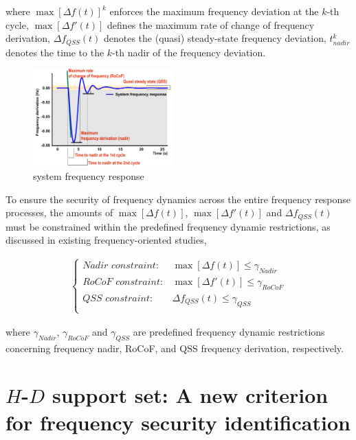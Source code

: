 \documentclass[lettersize,journal]{IEEEtran}
\begin{document}
\noindent
where $\max [\varDelta f(t)]^k$ enforces the maximum frequency deviation at the $k$-th cycle, $\max [\varDelta f'(t)]$ defines the maximum rate of change of frequency derivation, $\varDelta f_{QSS} (t)$ denotes the (quasi) steady-state frequency deviation, $t_{nadir}^k$ denotes the time to the $k$-th nadir of the frequency deviation.

\begin{figure}
  \centering
  \includegraphics[width=0.48\textwidth]{frequency_response.pdf}
  \caption{system frequency response}
  \label{fig:myimage}
\end{figure}

To ensure the security of frequency dynamics across the entire frequency response processes, the amounts of $\max[\varDelta f(t)]$, $\max[\varDelta f'(t)]$ and $\varDelta f_{QSS}(t)$ must be constrained within the predefined frequency dynamic restrictions, as discussed in existing frequency-oriented studies,

\begin{subequations}
  \begin{align}
  \left \{
  \begin{array}{rr}
  {Nadir\,\, constraint:}& \max[\varDelta f (t)] \leq \gamma_{Nadir}\\
  {RoCoF\,\, constraint:}&\max[\varDelta f' (t)] \leq \gamma_{RoCoF}\\
  {QSS\,\, constraint:} &\varDelta f_{QSS} (t) \leq \gamma_{QSS}\\
\end{array}
\right.
    \end{align}
  \end{subequations}

  \noindent
where $\gamma_{Nadir}$, $\gamma_{RoCoF}$ and $\gamma_{QSS}$ are predefined frequency dynamic restrictions concerning frequency nadir, RoCoF, and QSS frequency derivation, respectively.

\section{$H$-$D$ support set: A new criterion for frequency security identification}  
\end{document}
